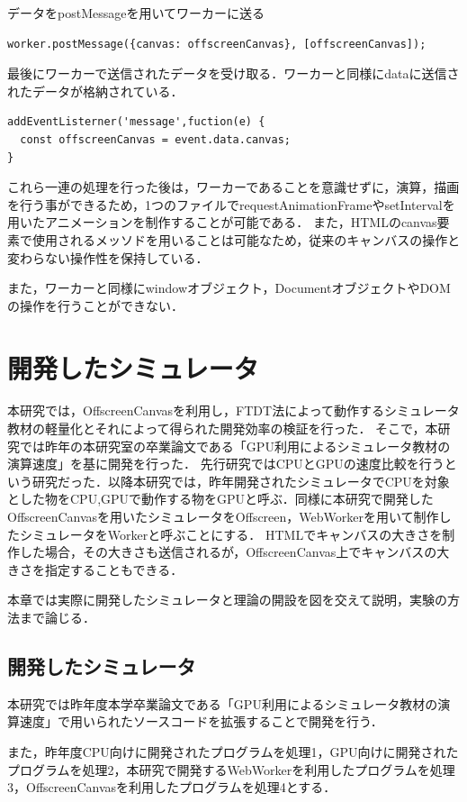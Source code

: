 \documentclass[a4j,12pt]{jsarticle}
\begin{document}
 データをpostMessageを用いてワーカーに送る
 \begin{lstlisting}[basicstyle=\ttfamily\footnotesize, frame=single]
worker.postMessage({canvas: offscreenCanvas}, [offscreenCanvas]);
 \end{lstlisting}
 
 最後にワーカーで送信されたデータを受け取る．ワーカーと同様にdataに送信されたデータが格納されている．
  \begin{lstlisting}[basicstyle=\ttfamily\footnotesize, frame=single]
 addEventListerner('message',fuction(e) { 
  const offscreenCanvas = event.data.canvas;
}
 \end{lstlisting} 
これら一連の処理を行った後は，ワーカーであることを意識せずに，演算，描画を行う事ができるため，1つのファイルでrequestAnimationFrameやsetIntervalを用いたアニメーションを制作することが可能である．
また，HTMLのcanvas要素で使用されるメッソドを用いることは可能なため，従来のキャンバスの操作と変わらない操作性を保持している．

また，ワーカーと同様にwindowオブジェクト，DocumentオブジェクトやDOMの操作を行うことができない．
\newpage
\section{開発したシミュレータ}
本研究では，OffscreenCanvasを利用し，FTDT法によって動作するシミュレータ教材の軽量化とそれによって得られた開発効率の検証を行った．
そこで，本研究では昨年の本研究室の卒業論文である「GPU利用によるシミュレータ教材の演算速度」を基に開発を行った．
先行研究ではCPUとGPUの速度比較を行うという研究だった．以降本研究では，昨年開発されたシミュレータでCPUを対象とした物をCPU,GPUで動作する物をGPUと呼ぶ．同様に本研究で開発したOffscreenCanvasを用いたシミュレータをOffscreen，WebWorkerを用いて制作したシミュレータをWorkerと呼ぶことにする．
HTMLでキャンバスの大きさを制作した場合，その大きさも送信されるが，OffscreenCanvas上でキャンバスの大きさを指定することもできる．

本章では実際に開発したシミュレータと理論の開設を図を交えて説明，実験の方法まで論じる．
\subsection{開発したシミュレータ}
本研究では昨年度本学卒業論文である「GPU利用によるシミュレータ教材の演算速度」で用いられたソースコードを拡張することで開発を行う．

また，昨年度CPU向けに開発されたプログラムを処理1，GPU向けに開発されたプログラムを処理2，本研究で開発するWebWorkerを利用したプログラムを処理3，OffscreenCanvasを利用したプログラムを処理4とする．
\end{document}
